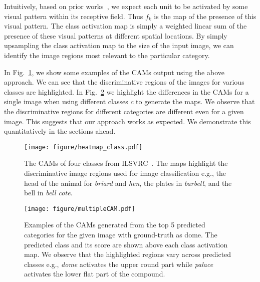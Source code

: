 \documentclass[10pt,twocolumn,letterpaper]{article}
\begin{document}
Intuitively, based on prior works~\cite{zhou2014object,zeiler2014visualizing}, we expect each unit to be activated by some visual pattern within its receptive field. Thus $f_k$ is the map of the presence of this visual pattern. The class activation map is simply a weighted linear sum of the presence of these visual patterns at different spatial locations. By simply upsampling the class activation map to the size of the input image, we can identify the image regions most relevant to the particular category.

In Fig.~\ref{figure_examplemapping}, we show some examples of the CAMs output using the above approach. We can see that the discriminative regions of the images for various classes are highlighted. In Fig.~\ref{figure_multipleprediction} we highlight the differences in the CAMs for a single image when using different classes $c$ to generate the maps. We observe that the discriminative regions for different categories are different even for a given image. This suggests that our approach works as expected. We demonstrate this quantitatively in the sections ahead.




\begin{figure}
\begin{center}
\texttt{[image: figure/heatmap\_class.pdf]}
\end{center}
\vspace*{-4mm}
 \caption{The CAMs of four classes from ILSVRC~\cite{ILSVRCijcv15}. The maps highlight the discriminative image regions used for image classification e.g., the head of the animal for \textit{briard} and \textit{hen}, the plates in \textit{barbell}, and the bell in \textit{bell cote}.}\label{figure_examplemapping}
\end{figure}


\begin{figure}
\begin{center}
\texttt{[image: figure/multipleCAM.pdf]}
\end{center}
\vspace*{-4mm}
 \caption{Examples of the CAMs generated from the top 5 predicted categories for the given image with ground-truth as dome. The predicted class and its score are shown above each class activation map. We observe that the highlighted regions vary across predicted classes e.g., \textit{dome} activates the upper round part while \textit{palace} activates the lower flat part of the compound.}\label{figure_multipleprediction}
\end{figure}
\end{document}
